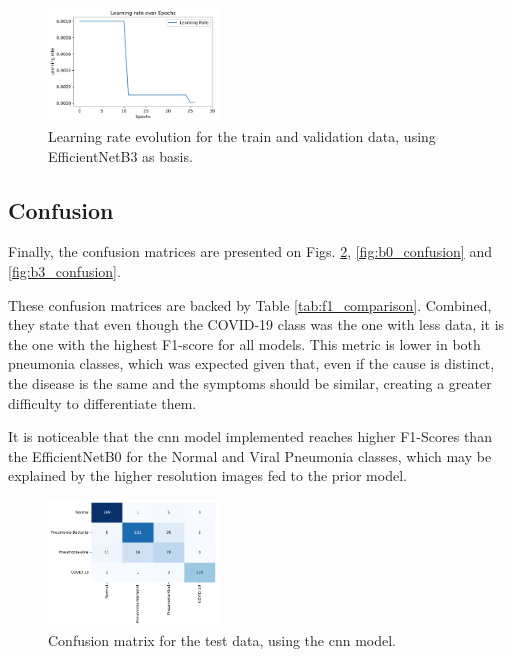 \documentclass[conference]{IEEEtran}
\begin{document}
\begin{figure}[htp]
    \centering
    \includegraphics[width=0.4\textwidth]{imgs/EfficientNetB3_lr.pdf}
    \caption{Learning rate evolution for the train and validation data, using EfficientNetB3 as basis.}
    \label{fig:b3_lr}
\end{figure}

\subsection{Confusion}

Finally, the confusion matrices are presented on Figs. \ref{fig:cnn_confusion}, \ref{fig:b0_confusion} and \ref{fig:b3_confusion}.

These confusion matrices are backed by Table \ref{tab:f1_comparison}. Combined, they state that even though the COVID-19 class was the one with less data, it is the one with the highest F1-score for all models. This metric is lower in both pneumonia classes, which was expected given that, even if the cause is distinct, the disease is the same and the symptoms should be similar, creating a greater difficulty to differentiate them.
 
It is noticeable that the \gls{cnn} model implemented reaches higher F1-Scores than the EfficientNetB0 for the Normal and Viral Pneumonia classes, which may be explained by the higher resolution images fed to the prior model.

\begin{figure}[htp]
    \centering
    \includegraphics[width=0.4\textwidth]{imgs/cnn_confusion.pdf}
    \caption{Confusion matrix for the test data, using the \gls{cnn} model.}
    \label{fig:cnn_confusion}
\end{figure}
\end{document}
